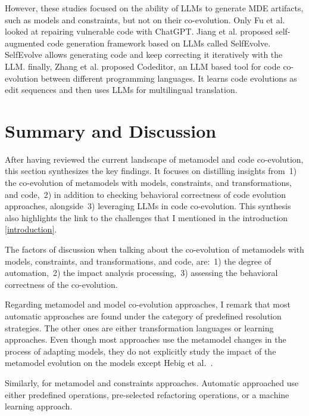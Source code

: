  However, these studies focused on the ability of LLMs to generate MDE artifacts, such as models and constraints, but not on their co-evolution. 
 Only Fu et al. \cite{fu2023chatgpt} looked at repairing vulnerable code with ChatGPT. 
 Jiang et al. \cite{jiang2023selfevolve} proposed self-augmented code generation framework based on LLMs called SelfEvolve. SelfEvolve allows generating code and keep correcting it iteratively with the LLM. %
 finally, Zhang et al. \cite{zhang2023multilingual} proposed Codeditor, an LLM based tool for code co-evolution between different programming languages. It learns code evolutions as edit sequences and then uses LLMs for multilingual translation.
  
  \section{Summary and Discussion}
 \label{sotadiscuss}
  After having reviewed the current landscape of metamodel and code co-evolution, this section synthesizes the key findings. It focuses on distilling insights from~1) the co-evolution of metamodels with models, constraints, and transformations, and code,~2) in addition to checking behavioral correctness of code evolution approaches, alongside~3) leveraging LLMs in code co-evolution. This synthesis also highlights the link to the challenges that I mentioned in the introduction \ref{introduction}.
  
  The factors of discussion when talking about the co-evolution of metamodels with models, constraints, and transformations, and code, are:~1) the degree of automation,~2) the impact analysis processing,~3) assessing the behavioral correctness of the co-evolution.
  
  Regarding metamodel and model co-evolution approaches, I remark that most automatic approaches are found under the category of predefined resolution strategies. The other ones are either transformation languages or learning approaches. Even though most approaches use the metamodel changes in the process of adapting models, they do not explicitly study the impact of the metamodel evolution on the models except Hebig et al.~\cite{hebig2016approaches}.
  
  Similarly, for metamodel and constraints approaches.
  Automatic approached use either predefined operations, pre-selected refactoring operations, or a machine learning approach.
  
